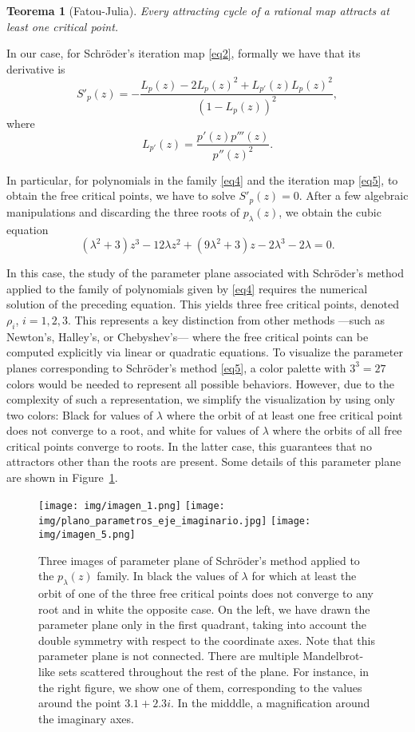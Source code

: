 \IfFileExists{aims.cls}{\documentclass{aims}}{\documentclass[11pt]{article}}
\numberwithin{equation}{section}
\newcommand{\includegraphics}[2][]{%
  }%
\renewcommand{\includegraphics}[2][]{%
  }%
\theoremstyle{thmstyleone}%
\newtheorem{theorem}{Teorema}%
\theoremstyle{thmstyletwo}%
\theoremstyle{thmstylethree}%
\begin{document}
\begin{theorem}[Fatou-Julia]
Every attracting cycle of a rational map attracts at least one critical point.
\end{theorem}

In our case, for Schr\"oder's iteration map  \eqref{eq2}, formally we have that its derivative is
$$
S'_{p}(z)=-\frac{L_p(z)-2L_p(z)^2+L_{p'}(z)L_p(z)^2}{(1-L_p(z))^2},
$$
where
 $$ L_{p'}(z)=\frac{p'(z)p'''(z)}{p''(z)^2}.$$


In particular, for polynomials in the family \eqref{eq4} and the iteration map \eqref{eq5}, to obtain the free critical points, we have to solve $S'_{p}(z)=0$. After a few algebraic manipulations and discarding the three roots of $p_{\lambda}(z)$, we obtain the cubic equation
$$
(\lambda ^2+3) z^3-12 \lambda  z^2+(9 \lambda ^2 +3) z-2 \lambda ^3-2 \lambda =0.
$$

In this case, the study of the parameter plane associated with Schröder's method applied to the family of polynomials given by \eqref{eq4} requires the numerical solution of the preceding equation. This yields three free critical points, denoted  $\rho_i$, $i=1,2,3$. This represents a key distinction from other methods ---such as Newton's, Halley's, or Chebyshev's--- where the free critical points can be computed explicitly via linear or quadratic equations. To visualize the parameter planes corresponding to Schröder's method \eqref{eq5}, a color palette with $3^3= 27$ colors would be needed to represent all possible behaviors. However, due to the complexity of such a representation, we simplify the visualization by using only two colors: Black for values of $\lambda$ where the orbit of at least one free critical point does not converge to a root, and white for values of $\lambda$ where the orbits of all free critical points converge to roots. In the latter case, this guarantees that no attractors other than the roots are present. Some details of this parameter plane are shown in Figure~\ref{fig2bis}.

\begin{figure}[H]%
\centering
\texttt{[image: img/imagen\_1.png]}
\texttt{[image: img/plano\_parametros\_eje\_imaginario.jpg]}
\texttt{[image: img/imagen\_5.png]}
\caption{Three images of parameter plane of  Schröder's method applied to the $p_{\lambda}(z)$ family. In black the values of $\lambda$ for which at least the orbit of one of the three free critical points does not converge to any root and in white the opposite case. On the left, we have drawn the parameter plane only in the first quadrant, taking into account the double symmetry with respect to the coordinate axes. Note that this parameter plane is not connected. There are multiple Mandelbrot-like sets scattered throughout the rest of the plane. For instance, in the right figure, we show one of them, corresponding to the values around the point $3.1+2.3i$. In the midddle, a magnification around the imaginary axes.}\label{fig2bis}
\end{figure}
\end{document}
